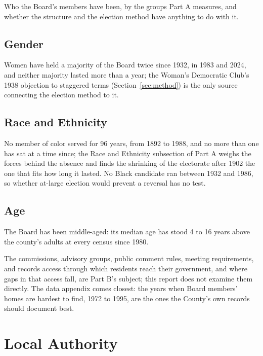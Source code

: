 Who the Board's members have been, by the groups Part A measures, and whether
the structure and the election method have anything to do with it.

\subsection{Gender}

Women have held a majority of the Board twice since 1932, in 1983 and 2024, and
neither majority lasted more than a year; the Woman's Democratic Club's 1938
objection to staggered terms (Section~\ref{sec:method}) is the only source
connecting the election method to it.

\subsection{Race and Ethnicity}

No member of color served for 96 years, from 1892 to 1988, and no more than one
has sat at a time since; the Race and Ethnicity subsection of Part A weighs the
forces behind the absence and finds the shrinking of the electorate after 1902
the one that fits how long it lasted. No Black candidate ran between 1932 and
1986, so whether at-large election would prevent a reversal has no test.

\subsection{Age}

The Board has been middle-aged: its median age has stood 4 to 16 years above
the county's adults at every census since 1980.

The commissions, advisory groups, public comment rules, meeting requirements,
and records access through which residents reach their government, and where
gaps in that access fall, are Part B's subject; this report does not examine
them directly. The data appendix comes closest: the years when Board members'
homes are hardest to find, 1972 to 1995, are the ones the County's own records
should document best.

\section{Local Authority}

